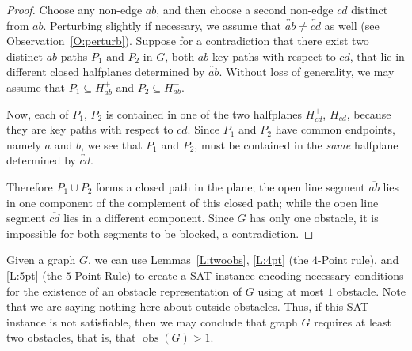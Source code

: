 \documentclass[12pt]{amsart}
\theoremstyle{remark}
\DeclareMathOperator{\obs}{\ensuremath{\mathrm{obs}}}
\begin{document}
\begin{proof}

Choose any non-edge $ab$,
and then choose a second non-edge $cd$ distinct from $ab$.
Perturbing slightly if necessary,
we assume that $\overleftrightarrow{ab} \neq \overleftrightarrow{cd}$ as well
(see Observation~\ref{O:perturb}).
Suppose for a contradiction that there exist two distinct $ab$ paths
$P_{1}$ and $P_{2}$ in $G$,
both $ab$ key paths with respect to $cd$,
that lie in different closed halfplanes
determined by $\overleftrightarrow{ab}$.
Without loss of generality, we may assume that
$P_{1} \subseteq H^{+}_{ab}$ and $P_{2} \subseteq H^{-}_{ab}$.

Now, each of $P_{1}$, $P_{2}$ is contained in one of the two halfplanes
$H^{+}_{cd}$, $H^{-}_{cd}$,
because they are key paths with respect to $cd$.
Since $P_{1}$ and $P_{2}$ have common endpoints, namely $a$ and $b$,
we see that $P_{1}$ and $P_{2}$,
must be contained in the \emph{same} halfplane determined by
$\overleftrightarrow{cd}$. 

Therefore $P_{1}\cup P_{2}$ forms a closed path in the plane;
the open line segment $\overline{ab}$ lies in one component
of the complement of this closed path;
while the open line segment $\overline{cd}$ lies in a different component.
Since $G$ has only one obstacle, it is impossible for both
segments to be blocked,
a contradiction.

%
\end{proof}

Given a graph $G$,
we can use Lemmas~\ref{L:twoobs}, \ref{L:4pt} (the $4$-Point rule),
and \ref{L:5pt} (the $5$-Point Rule)
to create a SAT instance
encoding necessary conditions for the existence
of an obstacle representation of $G$
using at most $1$ obstacle.
Note that we are saying nothing here about outside obstacles.
Thus, if this SAT instance is not satisfiable,
then we may conclude that graph $G$ requires at least two obstacles,
that is, that $\obs(G) > 1$.
\end{document}
